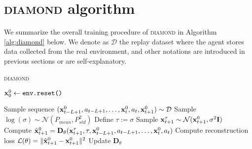 \section{\textsc{diamond} algorithm}
\label{app:algorithm}

We summarize the overall training procedure of \textsc{diamond} in Algorithm \ref{alg:diamond} below. We denote as $\mathcal{D}$ the replay dataset where the agent stores data collected from the real environment, and other notations are introduced in previous sections or are self-explanatory.

\begin{algorithm}[H]
\caption{\textsc{diamond}}
\label{alg:diamond}
\DontPrintSemicolon



\Proc{\FTrain{}}
{
}

{
    $\mathbf{x}_0^0 \gets \texttt{env.reset()}$ \;
}

\Proc{\FUpdateDiffusionModel{}}
{
    Sample sequence $ ( \mathbf{x}_{t-L+1}^0, a_{t-L+1}, \dots, \mathbf{x}_t^0, a_t, \mathbf{x}_{t+1}^0 ) \sim \mathcal{D} $ \;
    Sample $\log(\sigma) \sim \mathcal{N}(P_{mean}, P_{std}^2)$  \;
    Define $\tau := \sigma$ \;
    Sample $\mathbf{x}_{t+1}^\tau \sim \mathcal{N}(\mathbf{x}_{t+1}^0, \sigma^2 \mathbf{I})$  \;
    Compute $\hat{\mathbf{x}}_{t+1}^0 = \mathbf{D}_\theta(\mathbf{x}_{t+1}^\tau, \tau, \mathbf{x}_{t-L+1}^0, a_{t-L+1}, \dots, \mathbf{x}_t^0, a_t)$ \;
    Compute reconstruction loss $\mathcal{L}(\theta) = \Vert \hat{\mathbf{x}}_{t+1}^0 - \mathbf{x}_{t+1}^0 \Vert^2$ \;
    Update $\mathbf{D}_\theta$ \;
}


\end{algorithm}

